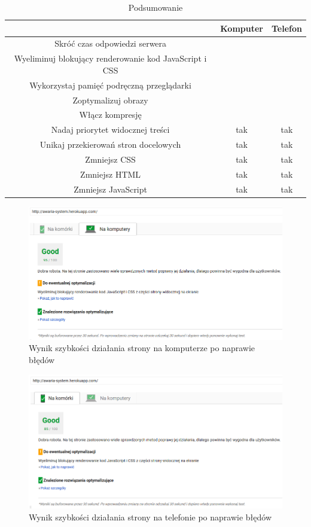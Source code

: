 \documentclass[openright]{xmgr}
\begin{document}
	\begin{table} [!h]
		\centering
		\begin{footnotesize}
			\caption{Podsumowanie}
	\begin{tabular}{|c|c|c|}
		\hline  & Komputer  & Telefon \\ 
		\hline  Skróć czas odpowiedzi serwera &  &  \\ 
		\hline  Wyeliminuj blokujący renderowanie kod JavaScript i CSS &  &  \\ 
		\hline Wykorzystaj pamięć podręczną przeglądarki &  &  \\ 
		\hline Zoptymalizuj obrazy &  &  \\ 
		\hline Włącz kompresję &  &  \\ 
		\hline Nadaj priorytet widocznej treści & tak & tak \\ 
		\hline Unikaj przekierowań stron docelowych & tak & tak \\ 
		\hline Zmniejsz CSS & tak & tak \\ 
		\hline Zmniejsz HTML & tak & tak \\ 
		\hline Zmniejsz JavaScript & tak & tak \\ 
		\hline 
	\end{tabular}
\end{footnotesize}
\end{table}

	
	\begin{figure}[!tbh]
		\centering
		\includegraphics[width=\linewidth]{image/wynik2}
		\caption{Wynik szybkości działania strony na komputerze po naprawie błędów}
	\end{figure}
	
	\begin{figure}[!tbh]
		\centering
		\includegraphics[width=\linewidth]{image/wynik1}
		\caption{Wynik szybkości działania strony na telefonie po naprawie błędów}
	\end{figure}
	\newpage
	
\end{document}
